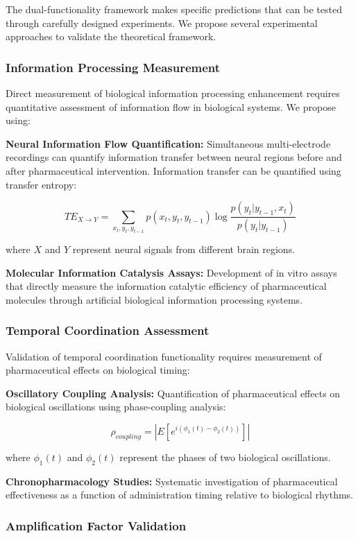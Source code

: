 \documentclass[12pt,a4paper]{article}
\begin{document}
The dual-functionality framework makes specific predictions that can be tested through carefully designed experiments. We propose several experimental approaches to validate the theoretical framework.

\subsubsection{Information Processing Measurement}

Direct measurement of biological information processing enhancement requires quantitative assessment of information flow in biological systems. We propose using:

\textbf{Neural Information Flow Quantification:}
Simultaneous multi-electrode recordings can quantify information transfer between neural regions before and after pharmaceutical intervention. Information transfer can be quantified using transfer entropy:

$$TE_{X \to Y} = \sum_{x_t, y_t, y_{t-1}} p(x_t, y_t, y_{t-1}) \log\frac{p(y_t|y_{t-1}, x_t)}{p(y_t|y_{t-1})}$$

where $X$ and $Y$ represent neural signals from different brain regions.

\textbf{Molecular Information Catalysis Assays:}
Development of in vitro assays that directly measure the information catalytic efficiency of pharmaceutical molecules through artificial biological information processing systems.

\subsubsection{Temporal Coordination Assessment}

Validation of temporal coordination functionality requires measurement of pharmaceutical effects on biological timing:

\textbf{Oscillatory Coupling Analysis:}
Quantification of pharmaceutical effects on biological oscillations using phase-coupling analysis:

$$\rho_{coupling} = |E[e^{i(\phi_1(t) - \phi_2(t))}]|$$

where $\phi_1(t)$ and $\phi_2(t)$ represent the phases of two biological oscillations.

\textbf{Chronopharmacology Studies:}
Systematic investigation of pharmaceutical effectiveness as a function of administration timing relative to biological rhythms.

\subsubsection{Amplification Factor Validation}
\end{document}
